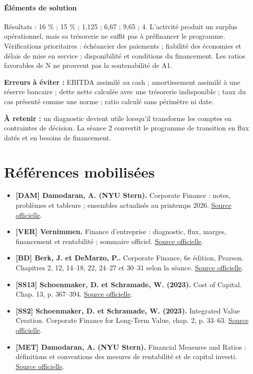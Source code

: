 \documentclass[12pt,a4paper]{article}
\begin{document}
\paragraph{Éléments de solution}
Résultats : 16 \% ; 15 \% ; 1,125 ; 6,67 ; 9,65 ; 4. L’activité produit un surplus opérationnel, mais sa trésorerie ne suffit pas à préfinancer le programme. Vérifications prioritaires : échéancier des paiements ; fiabilité des économies et délais de mise en service ; disponibilité et conditions du financement. Les ratios favorables de N ne prouvent pas la soutenabilité de A1.


\textbf{Erreurs à éviter :} EBITDA assimilé au cash ; amortissement assimilé à une réserve bancaire ; dette nette calculée avec une trésorerie indisponible ; taux du cas présenté comme une norme ; ratio calculé sans périmètre ni date.


\textbf{À retenir :} un diagnostic devient utile lorsqu’il transforme les comptes en contraintes de décision. La séance 2 convertit le programme de transition en flux datés et en besoins de financement.

\section*{Références mobilisées}
\small
\begin{itemize}
\item \textbf{[DAM] Damodaran, A. (NYU Stern).} Corporate Finance : notes, problèmes et tableurs ; ensembles actualisés au printemps 2026. \href{https://pages.stern.nyu.edu/~adamodar/New_Home_Page/cflect.htm}{Source officielle}.
\item \textbf{[VER] Vernimmen.} Finance d’entreprise : diagnostic, flux, marges, financement et rentabilité ; sommaire officiel. \href{https://www.vernimmen.fr/Vernimmen/Plan_du_livre.php}{Source officielle}.
\item \textbf{[BD] Berk, J. et DeMarzo, P..} Corporate Finance, 6e édition, Pearson. Chapitres 2, 12, 14--18, 22, 24--27 et 30--31 selon la séance. \href{https://www.pearson.com/en-us/subject-catalog/p/corporate-finance/P200000009791/9780137844906}{Source officielle}.
\item \textbf{[SS13] Schoenmaker, D. et Schramade, W. (2023).} Cost of Capital. Chap. 13, p. 367--394. \href{https://doi.org/10.1007/978-3-031-35009-2_13}{Source officielle}.
\item \textbf{[SS2] Schoenmaker, D. et Schramade, W. (2023).} Integrated Value Creation. Corporate Finance for Long-Term Value, chap. 2, p. 33--63. \href{https://doi.org/10.1007/978-3-031-35009-2_2}{Source officielle}.
\item \textbf{[MET] Damodaran, A. (NYU Stern).} Financial Measures and Ratios : définitions et conventions des mesures de rentabilité et de capital investi. \href{https://pages.stern.nyu.edu/~adamodar/New_Home_Page/definitions.html}{Source officielle}.
\end{itemize}\normalsize
\end{document}
